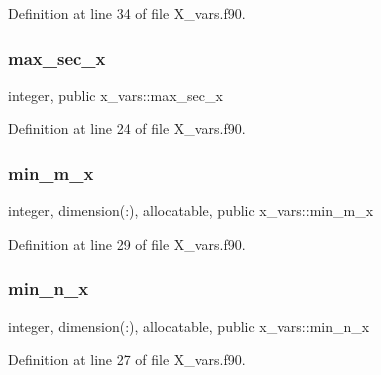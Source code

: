 Definition at line 34 of file X\+\_\+vars.\+f90.

\mbox{\label{namespacex__vars_ae19ca528c5688228ff20912a45290b2a}} 
\subsubsection{\texorpdfstring{max\+\_\+sec\+\_\+x}{max\_sec\_x}}
{\footnotesize\ttfamily integer, public x\+\_\+vars\+::max\+\_\+sec\+\_\+x}



Definition at line 24 of file X\+\_\+vars.\+f90.

\mbox{\label{namespacex__vars_aae62c7b4f8043dcccad97454b5857690}} 
\subsubsection{\texorpdfstring{min\+\_\+m\+\_\+x}{min\_m\_x}}
{\footnotesize\ttfamily integer, dimension(\+:), allocatable, public x\+\_\+vars\+::min\+\_\+m\+\_\+x}



Definition at line 29 of file X\+\_\+vars.\+f90.

\mbox{\label{namespacex__vars_a07485e5ebf54c236ae6f3c25e9cd2a93}} 
\subsubsection{\texorpdfstring{min\+\_\+n\+\_\+x}{min\_n\_x}}
{\footnotesize\ttfamily integer, dimension(\+:), allocatable, public x\+\_\+vars\+::min\+\_\+n\+\_\+x}



Definition at line 27 of file X\+\_\+vars.\+f90.

\mbox{\label{namespacex__vars_adec89f548ba63e203297222dce675b94}} 
